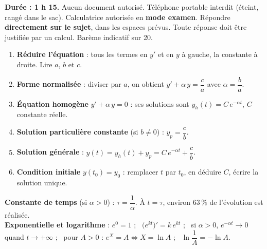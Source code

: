 \documentclass[a4paper,11pt]{article}
\begin{document}
\vspace{6pt}
\begin{tcolorbox}[colback=uimmlightgray, colframe=uimmgray, boxrule=0.6pt, arc=2pt, left=8pt, right=8pt, top=4pt, bottom=4pt]
\small\textbf{Durée : 1 h 15.} Aucun document autorisé. Téléphone portable interdit (éteint, rangé dans le sac). Calculatrice autorisée en \textbf{mode examen}. Répondre \textbf{directement sur le sujet}, dans les espaces prévus. Toute réponse doit être justifiée par un calcul. Barème indicatif sur 20.
\end{tcolorbox}

\begin{tcolorbox}[colback=uimmlightblue!40, colframe=uimmblue, boxrule=0.8pt, arc=2pt, left=8pt, right=8pt, top=4pt, bottom=4pt, title={\bfseries Rappel : résoudre $a\,y' + b\,y = c$ ($a$, $b$, $c$ constantes, $a \neq 0$)}, coltitle=white, colbacktitle=uimmblue]
\small
\begin{enumerate}[leftmargin=*, itemsep=1pt, topsep=1pt]
  \item \textbf{Réduire l'équation} : tous les termes en $y'$ et en $y$ à gauche, la constante à droite. Lire $a$, $b$ et $c$.
  \item \textbf{Forme normalisée} : diviser par $a$, on obtient $y' + \alpha\,y = \dfrac{c}{a}$ avec $\alpha = \dfrac{b}{a}$.
  \item \textbf{Équation homogène} $y' + \alpha\,y = 0$ : ses solutions sont $y_h(t) = C\,e^{-\alpha t}$, $C$ constante réelle.
  \item \textbf{Solution particulière constante} (si $b \neq 0$) : $y_p = \dfrac{c}{b}$.
  \item \textbf{Solution générale} : $y(t) = y_h(t) + y_p = C\,e^{-\alpha t} + \dfrac{c}{b}$.
  \item \textbf{Condition initiale} $y(t_0) = y_0$ : remplacer $t$ par $t_0$, en déduire $C$, écrire la solution unique.
\end{enumerate}
\textbf{Constante de temps} (si $\alpha > 0$) : $\tau = \dfrac{1}{\alpha}$. À $t = \tau$, environ $63\,\%$ de l'évolution est réalisée.\\
\textbf{Exponentielle et logarithme} : $e^{0} = 1$ ; \ $\big(e^{kt}\big)' = k\,e^{kt}$ ; \ si $\alpha > 0$, $e^{-\alpha t} \to 0$ quand $t \to +\infty$ ; \ pour $A > 0$ : $e^{X} = A \iff X = \ln A$ ; \ $\ln\dfrac{1}{A} = -\ln A$.
\end{tcolorbox}
\end{document}
